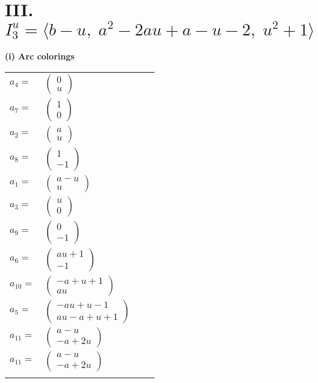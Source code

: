 \documentclass[1p]{elsarticle_modified}
\theoremstyle{definition}
\begin{document}
\centering \section*{III. $I^u_{3}= \langle b- u,\;a^2-2 a u+a- u-2,\;u^2+1 \rangle$}
\flushleft \textbf{(i) Arc colorings}\\
\begin{tabular}{m{7pt} m{180pt} m{7pt} m{180pt} }
\flushright $a_{4}=$&$\begin{pmatrix}0\\u\end{pmatrix}$ \\
\flushright $a_{7}=$&$\begin{pmatrix}1\\0\end{pmatrix}$ \\
\flushright $a_{2}=$&$\begin{pmatrix}a\\u\end{pmatrix}$ \\
\flushright $a_{8}=$&$\begin{pmatrix}1\\-1\end{pmatrix}$ \\
\flushright $a_{1}=$&$\begin{pmatrix}a- u\\u\end{pmatrix}$ \\
\flushright $a_{3}=$&$\begin{pmatrix}u\\0\end{pmatrix}$ \\
\flushright $a_{9}=$&$\begin{pmatrix}0\\-1\end{pmatrix}$ \\
\flushright $a_{6}=$&$\begin{pmatrix}a u+1\\-1\end{pmatrix}$ \\
\flushright $a_{10}=$&$\begin{pmatrix}- a+u+1\\a u\end{pmatrix}$ \\
\flushright $a_{5}=$&$\begin{pmatrix}- a u+u-1\\a u- a+u+1\end{pmatrix}$ \\
\flushright $a_{11}=$&$\begin{pmatrix}a- u\\- a+2 u\end{pmatrix}$\\ \flushright $a_{11}=$&$\begin{pmatrix}a- u\\- a+2 u\end{pmatrix}$\\&\end{tabular}
\end{document}
